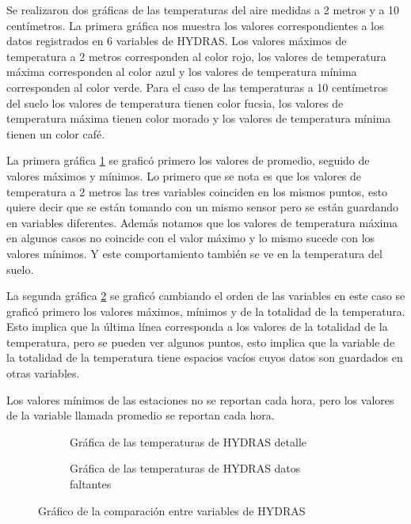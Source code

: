 Se realizaron dos gráficas de las temperaturas del aire medidas a 2 metros y a 10 centímetros. La primera gráfica nos muestra los valores correspondientes a los datos registrados en 6 variables de HYDRAS. Los valores máximos de temperatura a 2 metros corresponden al color rojo, los valores de temperatura máxima corresponden al color azul y los valores de temperatura mínima corresponden al color verde. Para el caso de las temperaturas a 10 centímetros del suelo los valores de temperatura tienen color fucsia, los valores de temperatura máxima tienen color morado y los valores de temperatura mínima tienen un color café.

La primera gráfica \ref{subfig:b9} se graficó primero los valores de promedio, seguido de valores máximos y mínimos. Lo primero que se nota es que los valores de temperatura a 2 metros las tres variables coinciden en los mismos puntos, esto quiere decir que se están tomando con un mismo sensor pero se están guardando en variables diferentes. Además notamos que los valores de temperatura máxima en algunos casos no coincide con el valor máximo y lo mismo sucede con los valores mínimos. Y este comportamiento también se ve en la temperatura del suelo.

La segunda gráfica \ref{subfig:b10} se graficó cambiando el orden de las variables en este caso se graficó primero los valores máximos, mínimos y de la totalidad de la temperatura. Esto implica que la última línea corresponda a los valores de la totalidad de la temperatura, pero se pueden ver algunos puntos, esto implica que la variable de la totalidad de la temperatura tiene espacios vacíos cuyos datos son guardados en otras variables.

Los valores mínimos de las estaciones no se reportan cada hora, pero los valores de la variable llamada promedio se reportan cada hora.

\begin{figure}[H]
	\centering
			\begin{subfigure}[b]{0.3\textwidth}

			\caption{Gráfica de las temperaturas de HYDRAS detalle}
			\label{subfig:b9}

			\end{subfigure}
			\begin{subfigure}[b]{0.3\textwidth}

		\caption{Gráfica de las temperaturas de HYDRAS datos faltantes}
			\label{subfig:b10}

			\end{subfigure}			

		
		\caption{Gráfico de la comparación entre variables de HYDRAS}
		\label{gra:conv_vali}
	
\end{figure}



